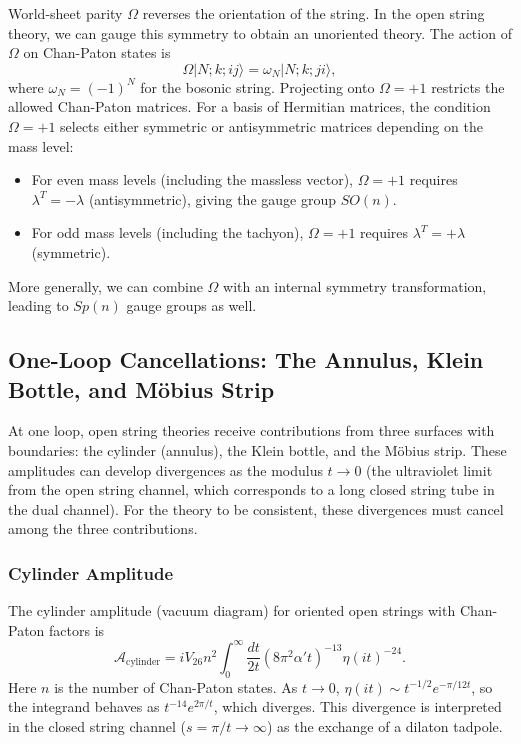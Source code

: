 \documentclass[11pt]{article}
\begin{document}
World-sheet parity $\Omega$ reverses the orientation of the string. In the open string theory, we can gauge this symmetry to obtain an unoriented theory. The action of $\Omega$ on Chan-Paton states is
\begin{equation}
\Omega |N; k; ij\rangle = \omega_N |N; k; ji\rangle,
\end{equation}
where $\omega_N = (-1)^{N}$ for the bosonic string. Projecting onto $\Omega=+1$ restricts the allowed Chan-Paton matrices. For a basis of Hermitian matrices, the condition $\Omega=+1$ selects either symmetric or antisymmetric matrices depending on the mass level:
\begin{itemize}
\item For even mass levels (including the massless vector), $\Omega=+1$ requires $\lambda^T = -\lambda$ (antisymmetric), giving the gauge group $SO(n)$.
\item For odd mass levels (including the tachyon), $\Omega=+1$ requires $\lambda^T = +\lambda$ (symmetric).
\end{itemize}
More generally, we can combine $\Omega$ with an internal symmetry transformation, leading to $Sp(n)$ gauge groups as well.

\subsection{One-Loop Cancellations: The Annulus, Klein Bottle, and Möbius Strip}

At one loop, open string theories receive contributions from three surfaces with boundaries: the cylinder (annulus), the Klein bottle, and the Möbius strip. These amplitudes can develop divergences as the modulus $t \to 0$ (the ultraviolet limit from the open string channel, which corresponds to a long closed string tube in the dual channel). For the theory to be consistent, these divergences must cancel among the three contributions.

\subsubsection{Cylinder Amplitude}
The cylinder amplitude (vacuum diagram) for oriented open strings with Chan-Paton factors is
\begin{equation}
\mathcal{A}_{\text{cylinder}} = i V_{26} n^2 \int_0^\infty \frac{dt}{2t} (8\pi^2\alpha't)^{-13} \eta(it)^{-24}.
\end{equation}
Here $n$ is the number of Chan-Paton states. As $t\to 0$, $\eta(it) \sim t^{-1/2} e^{-\pi/12t}$, so the integrand behaves as $t^{-14} e^{2\pi/t}$, which diverges. This divergence is interpreted in the closed string channel ($s = \pi/t \to \infty$) as the exchange of a dilaton tadpole.
\end{document}
